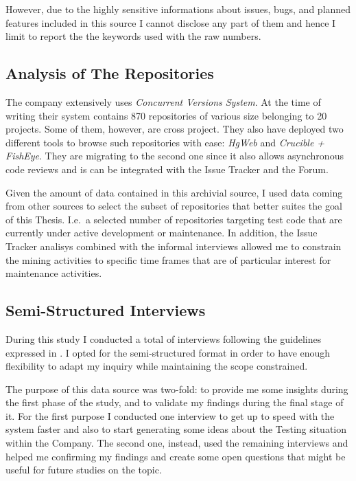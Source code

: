 However, due to the highly sensitive informations about issues, bugs, and planned features included in this source I cannot disclose any part of them and hence I limit to report the the keywords used with the raw numbers.






\subsection{Analysis of The Repositories} \label{analysis_of_the_repos}
The company extensively uses \textit{Concurrent Versions System}. At the time of writing their system contains 870 repositories of various size belonging to 20 projects. Some of them, however, are cross project. They also have deployed two different tools to browse such repositories with ease: \textit{HgWeb} and \textit{Crucible + FishEye}. They are migrating to the second one since it also allows asynchronous code reviews and is can be integrated with the Issue Tracker and the Forum.

Given the amount of data contained in this archivial source, I used data coming from other sources to select the subset of repositories that better suites the goal of this Thesis. I.e.\ a selected number of repositories targeting test code that are currently under active development or maintenance. In addition, the Issue Tracker analisys combined with the informal interviews allowed me to constrain the mining activities to specific time frames that are of particular interest for maintenance activities. 


\subsection{Semi-Structured Interviews} \label{semi-structured_interviews}
During this study I conducted a total of  interviews following the guidelines expressed in \cite{interview_guideline}. I opted for the semi-structured format in order to have enough flexibility to adapt my inquiry while maintaining the scope constrained.

The purpose of this data source was two-fold: to provide me some insights during the first phase of the study, and to validate my findings during the final stage of it. For the first purpose I conducted one interview to get up to speed with the system faster and also to start generating some ideas about the Testing situation within the Company. The second one, instead, used the remaining interviews and helped me confirming my findings and create some open questions that might be useful for future studies on the topic.

